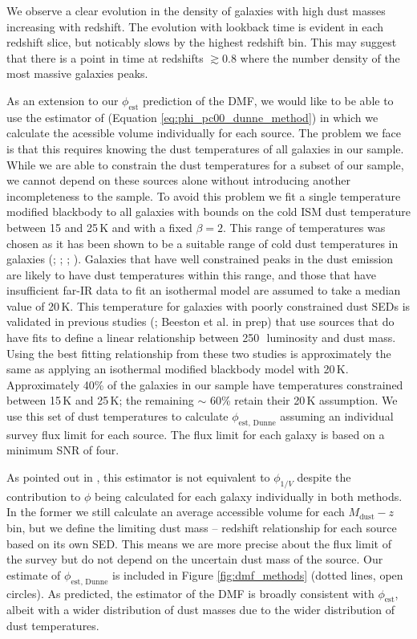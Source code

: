 We observe a clear evolution in the density of galaxies with high dust masses increasing with redshift. The evolution with lookback time is evident in each redshift slice, but noticably slows by the highest redshift bin. This may suggest that there is a point in time at redshifts $\gtrsim 0.8$ where the number density of the most massive galaxies peaks.

As an extension to our $\phi_{\textrm{est}}$ prediction of the DMF, we would like to be able to use the estimator of \citealt{Dunne_2011} (Equation \ref{eq:phi_pc00_dunne_method}) in which we calculate the acessible volume individually for each source. The problem we face is that this requires knowing the dust temperatures of all galaxies in our sample. While we are able to constrain the dust temperatures for a subset of our sample, we cannot depend on these sources alone without introducing another incompleteness to the sample. To avoid this problem we fit a single temperature modified blackbody to all galaxies with bounds on the cold ISM dust temperature between 15 and 25\,K and with a fixed $\beta = 2$. This range of temperatures was chosen as it has been shown to be a suitable range of cold dust temperatures in galaxies (\citealt{Dunne_2001}; \citealt{Smith_2012b}; \citealt{Clark_2015}; \citealt{Beeston_2018}). Galaxies that have well constrained peaks in the dust emission are likely to have dust temperatures within this range, and those that have insufficient far-IR data to fit an isothermal model are assumed to take a median value of 20\,K. This temperature for galaxies with poorly constrained dust SEDs is validated in previous studies (\citealt{Dunne_2011}; Beeston et al. in prep) that use sources that do have fits to define a linear relationship between 250\,\micron\ luminosity and dust mass. Using the best fitting relationship from these two studies is approximately the same as applying an isothermal modified blackbody model with 20\,K. Approximately 40\% of the galaxies in our sample have temperatures constrained between 15\,K and 25\,K; the remaining $\sim$ 60\% retain their 20\,K assumption. We use this set of dust temperatures to calculate $\phi_{\textrm{est, Dunne}}$ assuming an individual survey flux limit for each source. The flux limit for each galaxy is based on a minimum SNR of four. 

As pointed out in \citealt{Dunne_2011}, this estimator is not equivalent to $\phi_{1/V}$ despite the contribution to $\phi$ being calculated for each galaxy individually in both methods. In the former we still calculate an average accessible volume for each $M_{\textrm{dust}} - z$ bin, but we define the limiting dust mass -- redshift relationship for each source based on its own SED. This means we are more precise about the flux limit of the survey but do not depend on the uncertain dust mass of the source. Our estimate of $\phi_{\textrm{est, Dunne}}$ is included in Figure \ref{fig:dmf_methods} (dotted lines, open circles). As predicted, the \citealt{Dunne_2011} estimator of the DMF is broadly consistent with $\phi_{\textrm{est}}$, albeit with a wider distribution of dust masses due to the wider distribution of dust temperatures.

